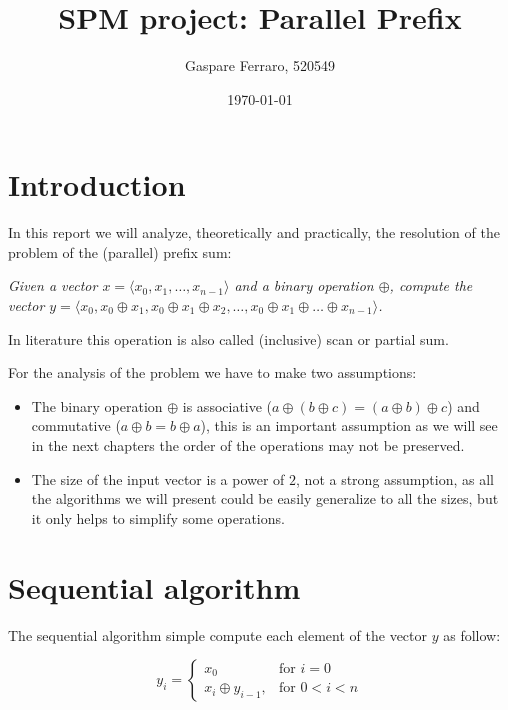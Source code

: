 \documentclass{article}
\title{SPM project: Parallel Prefix}
\author{Gaspare Ferraro, 520549}
\affil{Master Degree in Computer Science - University of Pisa}
\affil[]{ferraro@gaspa.re}
\date{\today}
\newcommand{\for}{\text{for }}
\begin{document}
 
\maketitle
 
\section{Introduction}

In this report we will analyze, theoretically and practically, the resolution of the problem of the (parallel) prefix sum:

\medskip

\textit{Given a vector $x = \langle x_{0}, x_{1}, \ldots, x_{n-1} \rangle$ and a binary operation $\oplus$, compute the vector $y = \langle x_{0}, x_{0} \oplus x_{1}, x_{0} \oplus x_{1} \oplus x_{2}, \ldots, x_{0} \oplus x_{1} \oplus \ldots \oplus x_{n-1} \rangle$.} %

\medskip

In literature this operation is also called (inclusive) scan or partial sum.

\medskip

For the analysis of the problem we have to make two assumptions:

\begin{itemize}
  \item The binary operation $\oplus$ is associative ($ a \oplus ( b \oplus c ) =  (a \oplus b) \oplus c  $) and commutative ($a \oplus b = b \oplus a$), this is an important assumption as we will see in the next chapters the order of the operations may not be preserved.
  \item The size of the input vector is a power of $2$, not a strong assumption, as all the algorithms we will present could be easily generalize to all the sizes, but it only helps to simplify some operations.
\end{itemize}

\section{Sequential algorithm}

The sequential algorithm simple compute each element of the vector $y$ as follow:

\begin{equation*}[]
    y_{i} =
    \begin{cases}
      x_{0}& \for i = 0 \\
      x_{i} \oplus y_{i-1},& \for 0 <  i < n
    \end{cases}
\end{equation*}
\end{document}
